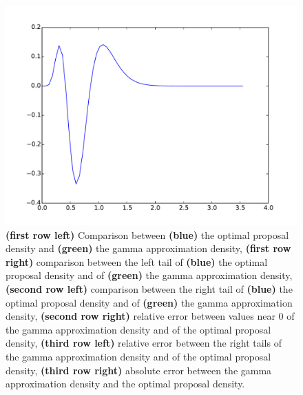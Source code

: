 \documentclass{article}
\begin{document}
\begin{figure}[htb]
\begin{minipage}{.45\textwidth}
	\end{minipage}
	\begin{minipage}{.45\textwidth}
		\centering
		\includegraphics[width=0.97\linewidth]{bootstrap-filter/absolute_complex_3_3.pdf}
	\end{minipage}
	\caption{\textbf{(first row left)} Comparison between \textbf{(blue)} the optimal proposal density and \textbf{(green)} the gamma approximation density, \textbf{(first row right)} comparison between  the left tail of \textbf{(blue)} the optimal proposal density and of \textbf{(green)} the gamma approximation density, \textbf{(second row left)} comparison between the right tail of \textbf{(blue)} the optimal proposal density and of \textbf{(green)} the gamma approximation density, \textbf{(second row right)} relative error between values near 0 of the gamma approximation density and of the optimal proposal density, \textbf{(third row left)} relative error between the right tails of the gamma approximation density and of the optimal proposal density, \textbf{(third row right)} absolute error between the gamma approximation density and the optimal proposal density.}
\end{figure}
\end{document}

